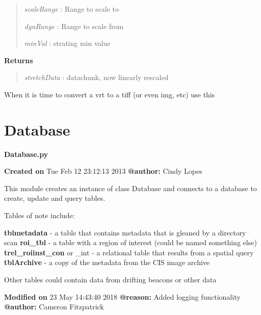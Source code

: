 \documentclass[letterpaper,10pt,english]{sphinxmanual}
\begin{document}
\begin{fulllineitems}
\begin{fulllineitems}
\begin{quote}
\emph{scaleRange}  : Range to scale to

\emph{dynRange}    : Range to scale from

\emph{minVal}      : strating min value
\end{quote}

\textbf{Returns}
\begin{quote}

\emph{stretchData} : datachunk, now linearly rescaled
\end{quote}

\end{fulllineitems}


\begin{fulllineitems}
\label{code:Image.Image.vrt2RealImg}
When it is time to convert a vrt to a tiff (or even img, etc) use this

\end{fulllineitems}


\end{fulllineitems}



\section{Database}
\label{code:database}\label{code:module-Database}
\textbf{Database.py}

\textbf{Created on} Tue Feb 12 23:12:13 2013 \textbf{@author:} Cindy Lopes

This module creates an instance of class Database and connects to a database to
create, update and query tables.

Tables of note include:

\textbf{tblmetadata} - a table that contains metadata that is gleaned by a directory scan
\textbf{roi\_tbl} - a table with a region of interest (could be named something else)
\textbf{trel\_roiinst\_con} or \_int - a relational table that results from a spatial query
\textbf{tblArchive} - a copy of the metadata from the CIS image archive

Other tables could contain data from drifting beacons or other data

\textbf{Modified on} 23 May 14:43:40 2018 \textbf{@reason:} Added logging functionality \textbf{@author:} Cameron Fitzpatrick
\end{document}

